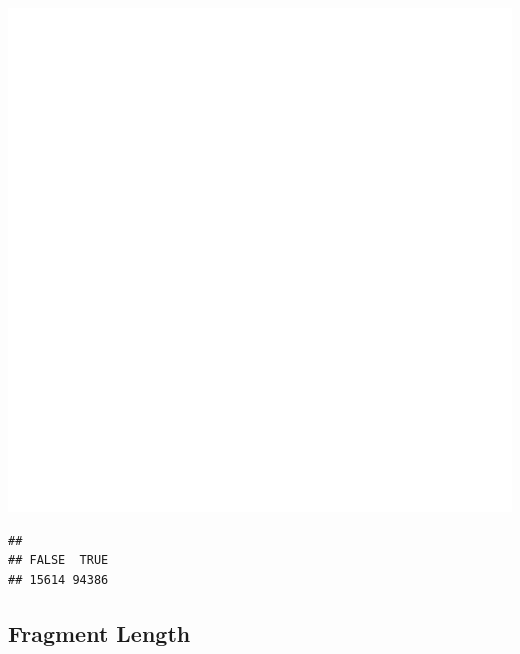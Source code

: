 \documentclass[12pt, a4paper]{article}\usepackage[]{graphicx}\usepackage[]{color}
\makeatletter
\def\maxwidth{ %
  \ifdim\Gin@nat@width>\linewidth
    \linewidth
  \else
    \Gin@nat@width
  \fi
}
\newenvironment{kframe}{%
 \def\at@end@of@kframe{}%
 \ifinner\ifhmode%
  \def\at@end@of@kframe{\end{minipage}}%
  \begin{minipage}{\columnwidth}%
 \fi\fi%
 \def\FrameCommand##1{\hskip\@totalleftmargin \hskip-\fboxsep
 \colorbox{shadecolor}{##1}\hskip-\fboxsep
     \hskip-\linewidth \hskip-\@totalleftmargin \hskip\columnwidth}%
 \MakeFramed {\advance\hsize-\width
   \@totalleftmargin\z@ \linewidth\hsize
   \@setminipage}}%
 {\par\unskip\endMakeFramed%
 \at@end@of@kframe}
\newenvironment{knitrout}{}{} %
\makeatother
\begin{document}
\begin{knitrout}
\includegraphics[width=\maxwidth]{figure/unnamed-chunk-3-30} 
\begin{kframe}\begin{verbatim}
## 
## FALSE  TRUE 
## 15614 94386
\end{verbatim}
\end{kframe}
\end{knitrout}

\clearpage
\subsection{Fragment Length}
\end{document}
